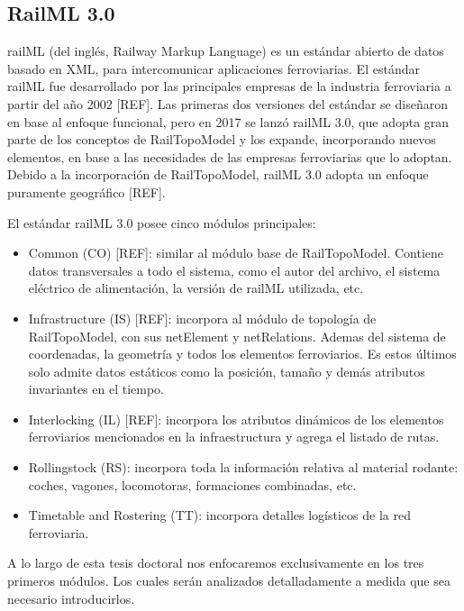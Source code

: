 \subsection{RailML 3.0}

	railML \cite{Paper_101,Paper_106,Paper_154} (del inglés, Railway Markup Language) es un estándar abierto de datos basado en XML, para intercomunicar aplicaciones ferroviarias. El estándar railML fue desarrollado por las principales empresas de la industria ferroviaria a partir del año 2002 [REF]. Las primeras dos versiones del estándar se diseñaron en base al enfoque funcional, pero en 2017 se lanzó railML 3.0, que adopta gran parte de los conceptos de RailTopoModel y los expande, incorporando nuevos elementos, en base a las necesidades de las empresas ferroviarias que lo adoptan. Debido a la incorporación de RailTopoModel, railML 3.0 adopta un enfoque puramente geográfico [REF].
	
	El estándar railML 3.0 posee cinco módulos principales:
	

    \begin{itemize}
        \item Common (CO) [REF]: similar al módulo base de RailTopoModel. Contiene datos transversales a todo el sistema, como el autor del archivo, el sistema eléctrico de alimentación, la versión de railML utilizada, etc.
        \item Infrastructure (IS) [REF]: incorpora al módulo de topología de RailTopoModel, con sus netElement y netRelations. Ademas del sistema de coordenadas, la geometría y todos los elementos ferroviarios. Es estos últimos solo admite datos estáticos como la posición, tamaño y demás atributos invariantes en el tiempo.
        \item Interlocking (IL) [REF]: incorpora los atributos dinámicos de los elementos ferroviarios mencionados en la infraestructura y agrega el listado de rutas.
        \item Rollingstock (RS): incorpora toda la información relativa al material rodante: coches, vagones, locomotoras, formaciones combinadas, etc.
        \item Timetable and Rostering (TT): incorpora detalles logísticos de la red ferroviaria.
    \end{itemize}

    A lo largo de esta tesis doctoral nos enfocaremos exclusivamente en los tres primeros módulos. Los cuales serán analizados detalladamente a medida que sea necesario introducirlos.